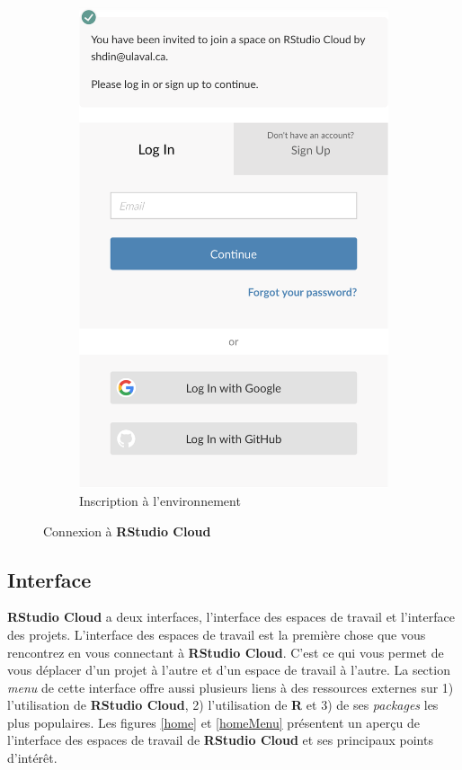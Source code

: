 \documentclass[10.5pt,a4paper]{article}
\begin{document}
\begin{figure}[H]
\begin{subfigure}{.5\textwidth}
  \includegraphics[width=1\linewidth]{_graphs/workspace.png}
  \caption{Inscription à l'environnement}
  \label{workspace}
\end{subfigure}
\caption{Connexion à \textbf{RStudio Cloud}}
\label{connexion}
\end{figure}
  
  \subsection{Interface}
  \textbf{RStudio Cloud} a deux interfaces, l'interface des espaces de travail et l'interface des projets. L'interface des espaces de travail est la première chose que vous rencontrez en vous connectant à \textbf{RStudio Cloud}. C'est ce qui vous permet de vous déplacer d'un projet à l'autre et d'un espace de travail à l'autre. La section \emph{menu} de cette interface offre aussi plusieurs liens à des ressources externes sur 1) l'utilisation de \textbf{RStudio Cloud}, 2) l'utilisation de \textbf{R} et 3) de ses \emph{packages} les plus populaires. Les figures \ref{home} et \ref{homeMenu} présentent un aperçu de l'interface des espaces de travail de \textbf{RStudio Cloud} et ses principaux points d'intérêt.
  
\end{document}
